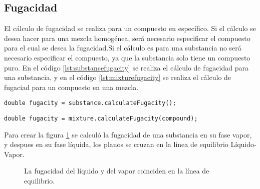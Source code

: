 \subsection{Fugacidad}\label{subsec:fugacity}
	
	El cálculo de fugacidad se realiza para un compuesto en específico. Si el cálculo se desea hacer para una mezcla homogénea, será necesario especificar el compuesto para el cual se desea la fugacidad.Si el cálculo es para una substancia no será necesario especificar el compuesto, ya que la substancia solo tiene un compuesto puro. En el código \ref{lst:substancefugacity} se realiza el cálculo de fugacidad para una substancia, y en el código \ref{lst:mixturefugacity} se realiza el cálculo de fugaciad para un compuesto en una mezcla.

\begin{lstlisting}[label={lst:substancefugacity}, caption={Cálculo de la fugacidad para una substancia homogénea.}]
	double fugacity = substance.calculateFugacity();
\end{lstlisting}

\begin{lstlisting}[label={lst:mixturefugacity}, caption={Cálculo de la fugacidad para un compuesto en una mezcla.}]
	double fugacity = mixture.calculateFugacity(compound);
\end{lstlisting}

	Para crear la figura \ref{fig:fugacity} se calculó la fugacidad de una substancia en su fase vapor, y despues en su fase líquida, los planos se cruzan en la línea de equilibrio Líquido-Vapor.

\begin{figure}[!h]
	\centering
	\caption{La fugacidad del líquido y del vapor coinciden en la línea de equilibrio.}\label{fig:fugacity}
\end{figure}



